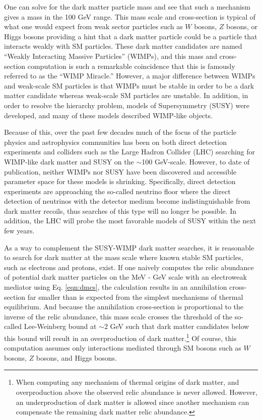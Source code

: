 One can solve for the dark matter particle mass and see that such a mechanism gives a mass in the 100 GeV range. This mass scale and cross-section is typical of what one would expect from weak sector particles such as $W$ bosons, $Z$ bosons, or Higgs bosons providing a hint that a dark matter particle could be a particle that interacts weakly with SM particles. These dark matter candidates are named ``Weakly Interacting Massive Particles'' (WIMPs), and this mass and cross-section computation is such a remarkable coincidence that this is famously referred to as the ``WIMP Miracle.'' However, a major difference between WIMPs and weak-scale SM particles is that WIMPs must be stable in order to be a dark matter candidate whereas weak-scale SM particles are unstable. In addition, in order to resolve the hierarchy problem, models of Supersymmetry (SUSY) were developed, and many of these models described WIMP-like objects.

Because of this, over the past few decades much of the focus of the particle physics and astrophysics communities has been on both direct detection experiments and colliders such as the Large Hadron Collider (LHC) searching for WIMP-like dark matter and SUSY on the $\sim$100 GeV-scale. However, to date of publication, neither WIMPs nor SUSY have been discovered and accessible parameter space for these models is shrinking. Specifically, direct detection experiments are approaching the so-called neutrino floor where the direct detection of neutrinos with the detector medium become indistinguishable from dark matter recoils, thus searches of this type will no longer be possible. In addition, the LHC will probe the most favorable models of SUSY within the next few years.

As a way to complement the SUSY-WIMP dark matter searches, it is reasonable to search for dark matter at the mass scale where known stable SM particles, such as electrons and protons, exist. If one naively computes the relic abundance of potential dark matter particles on the MeV - GeV scale with an electroweak mediator using Eq. \ref{eqn:dmcs}, the calculation results in an annihilation cross-section far smaller than is expected from the simplest mechanisms of thermal equilibrium. And because the annihilation cross-section is proportional to the inverse of the relic abundance, this mass scale crosses the threshold of the so-called Lee-Weinberg bound at $\sim$2 GeV such that dark matter candidates below this bound will result in an overproduction of dark matter.\footnote{When computing any mechanism of thermal origins of dark matter, and overproduction above the observed relic abundance is never allowed. However, an underproduction of dark matter is allowed since another mechanism can compensate the remaining dark matter relic abundance.} Of course, this computation assumes only interactions mediated through SM bosons such as $W$ bosons, $Z$ bosons, and Higgs bosons.

